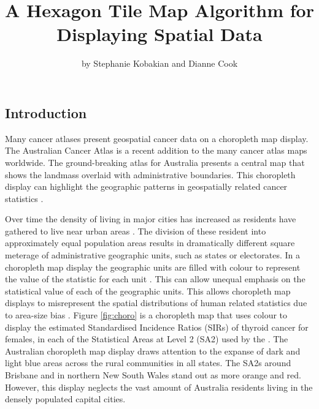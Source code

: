 \title{A Hexagon Tile Map Algorithm for Displaying Spatial Data}
\author{by Stephanie Kobakian and Dianne Cook}

\maketitle


\hypertarget{introduction}{%
\subsection{Introduction}\label{introduction}}

Many cancer atlases present geospatial cancer data on a choropleth map
display. The Australian Cancer Atlas \citep{TACA} is a recent addition
to the many cancer atlas maps worldwide. The ground-breaking atlas for
Australia presents a central map that shows the landmass overlaid with
administrative boundaries. This choropleth display can highlight the
geographic patterns in geospatially related cancer statistics
\citep{SAMGIS}.

Over time the density of living in major cities has increased as
residents have gathered to live near urban areas \citep{ACTUC}. The
division of these resident into approximately equal population areas
results in dramatically different square meterage of administrative
geographic units, such as states or electorates. In a choropleth map
display the geographic units are filled with colour to represent the
value of the statistic for each unit \citep{EI}. This can allow unequal
emphasis on the statistical value of each of the geographic units. This
allows choropleth map displays to misrepresent the spatial distributions
of human related statistics due to area-size bias \citep{BCM}. Figure
\ref{fig:choro} is a choropleth map that uses colour to display the
estimated Standardised Incidence Ratios (SIRs) of thyroid cancer for
females, in each of the Statistical Areas at Level 2 (SA2) used by the
\citet{abs2011}. The Australian choropleth map display draws attention
to the expanse of dark and light blue areas across the rural communities
in all states. The SA2s around Brisbane and in northern New South Wales
stand out as more orange and red. However, this display neglects the
vast amount of Australia residents living in the densely populated
capital cities.

